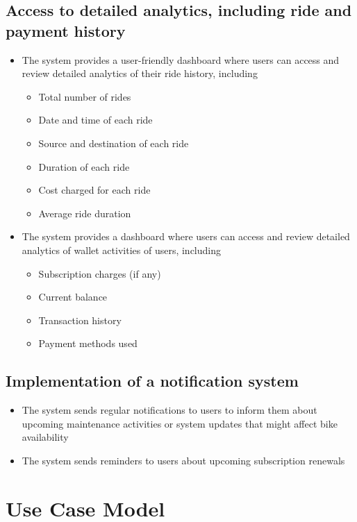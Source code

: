 \documentclass{scrreprt}
\begin{document}
\subsection{Access to detailed analytics, including ride and payment history}
\begin{itemize}
    \item The system provides a user-friendly dashboard where users can access and review detailed analytics of their ride history, including
    \begin{itemize}[label={*}]
        \item Total number of rides
        \item Date and time of each ride
        \item Source and destination of each ride
        \item Duration of each ride
        \item Cost charged for each ride
        \item Average ride duration
    \end{itemize}
    \item The system provides a dashboard where users can access and review detailed analytics of wallet activities of users, including
    \begin{itemize}[label={*}]
        \item Subscription charges (if any)
        \item Current balance
        \item Transaction history
        \item Payment methods used
    \end{itemize}
\end{itemize}

\subsection{Implementation of a notification system}
\begin{itemize}
    \item The system sends regular notifications to users to inform them about upcoming maintenance activities or system updates that might affect bike availability
    \item The system sends reminders to users about upcoming subscription renewals
\end{itemize}
\newpage
\section{Use Case Model}
\end{document}
